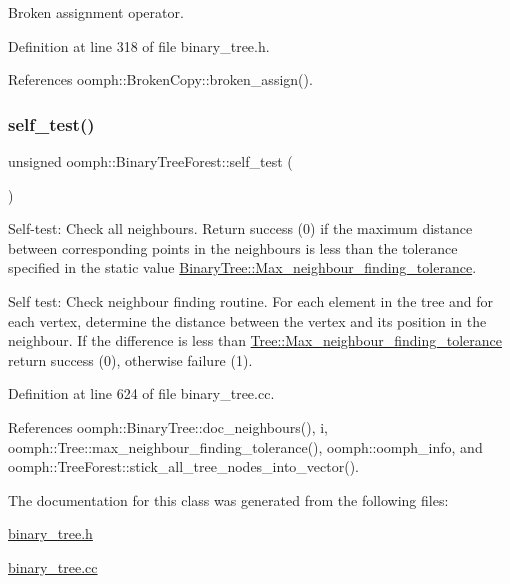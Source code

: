 Broken assignment operator. 



Definition at line 318 of file binary\+\_\+tree.\+h.



References oomph\+::\+Broken\+Copy\+::broken\+\_\+assign().

\mbox{\label{classoomph_1_1BinaryTreeForest_a7cf3ec0bdb4c0955ca35bcc2e0874f80}} 
\subsubsection{\texorpdfstring{self\+\_\+test()}{self\_test()}}
{\footnotesize\ttfamily unsigned oomph\+::\+Binary\+Tree\+Forest\+::self\+\_\+test (\begin{DoxyParamCaption}{ }\end{DoxyParamCaption})}



Self-\/test\+: Check all neighbours. Return success (0) if the maximum distance between corresponding points in the neighbours is less than the tolerance specified in the static value \hyperlink{classoomph_1_1Tree_aef9abebc166fa3bf81ecb59ec0d5d6b2}{Binary\+Tree\+::\+Max\+\_\+neighbour\+\_\+finding\+\_\+tolerance}. 

Self test\+: Check neighbour finding routine. For each element in the tree and for each vertex, determine the distance between the vertex and its position in the neighbour. If the difference is less than \hyperlink{classoomph_1_1Tree_aef9abebc166fa3bf81ecb59ec0d5d6b2}{Tree\+::\+Max\+\_\+neighbour\+\_\+finding\+\_\+tolerance} return success (0), otherwise failure (1). 

Definition at line 624 of file binary\+\_\+tree.\+cc.



References oomph\+::\+Binary\+Tree\+::doc\+\_\+neighbours(), i, oomph\+::\+Tree\+::max\+\_\+neighbour\+\_\+finding\+\_\+tolerance(), oomph\+::oomph\+\_\+info, and oomph\+::\+Tree\+Forest\+::stick\+\_\+all\+\_\+tree\+\_\+nodes\+\_\+into\+\_\+vector().



The documentation for this class was generated from the following files\+:\begin{DoxyCompactItemize}
\item 
\hyperlink{binary__tree_8h}{binary\+\_\+tree.\+h}\item 
\hyperlink{binary__tree_8cc}{binary\+\_\+tree.\+cc}\end{DoxyCompactItemize}
